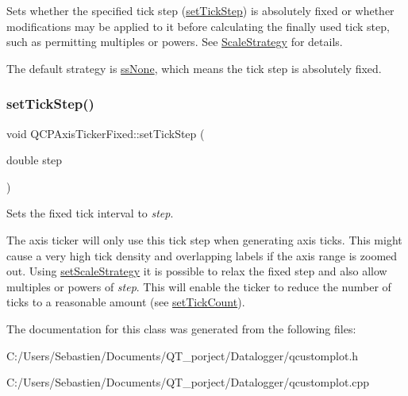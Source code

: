 Sets whether the specified tick step (\hyperlink{class_q_c_p_axis_ticker_fixed_a4bc83d85a4f81d4abdd3fa5042d7b833}{set\+Tick\+Step}) is absolutely fixed or whether modifications may be applied to it before calculating the finally used tick step, such as permitting multiples or powers. See \hyperlink{class_q_c_p_axis_ticker_fixed_a15b3d38b935d404b1311eb85cfb6a439}{Scale\+Strategy} for details.

The default strategy is \hyperlink{class_q_c_p_axis_ticker_fixed_a15b3d38b935d404b1311eb85cfb6a439a6621275677a05caa0de204ae3956b85f}{ss\+None}, which means the tick step is absolutely fixed. \mbox{\label{class_q_c_p_axis_ticker_fixed_a4bc83d85a4f81d4abdd3fa5042d7b833}} 
\subsubsection{\texorpdfstring{set\+Tick\+Step()}{setTickStep()}}
{\footnotesize\ttfamily void Q\+C\+P\+Axis\+Ticker\+Fixed\+::set\+Tick\+Step (\begin{DoxyParamCaption}\item[{double}]{step }\end{DoxyParamCaption})}

Sets the fixed tick interval to {\itshape step}.

The axis ticker will only use this tick step when generating axis ticks. This might cause a very high tick density and overlapping labels if the axis range is zoomed out. Using \hyperlink{class_q_c_p_axis_ticker_fixed_acbc7c9bcd80b3dc3edee5f0519d301f6}{set\+Scale\+Strategy} it is possible to relax the fixed step and also allow multiples or powers of {\itshape step}. This will enable the ticker to reduce the number of ticks to a reasonable amount (see \hyperlink{class_q_c_p_axis_ticker_a47752abba8293e6dc18491501ae34008}{set\+Tick\+Count}). 

The documentation for this class was generated from the following files\+:\begin{DoxyCompactItemize}
\item 
C\+:/\+Users/\+Sebastien/\+Documents/\+Q\+T\+\_\+porject/\+Datalogger/qcustomplot.\+h\item 
C\+:/\+Users/\+Sebastien/\+Documents/\+Q\+T\+\_\+porject/\+Datalogger/qcustomplot.\+cpp\end{DoxyCompactItemize}
